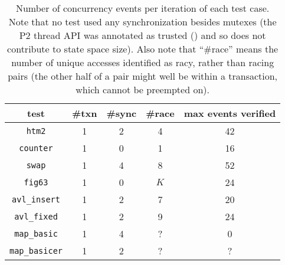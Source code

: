 \begin{table}[h]
	\begin{center}
		\small
		\begin{tabular}{c||c|c|c||c}
			{\bf test} & {\bf \#txn} & {\bf \#sync} & {\bf \#race} & {\bf max events verified} \\
			\hline
			{\tt htm2}		& 1	& 2	& 4	& 42	\\ %
			{\tt counter}		& 1	& 0	& 1	& 16	\\ %
			{\tt swap}		& 1	& 4	& 8	& 52	\\ %
			{\tt fig63}		& 1	& 0	& $K$	& 24	\\ %
			{\tt avl\_insert}	& 1	& 2	& 7	& 20	\\ %
			{\tt avl\_fixed}	& 1	& 2	& 9	& 24	\\ %
			{\tt map\_basic}	& 1	& 4	& ?	& 0	\\ %
			{\tt map\_basicer}	& 1	& 2	& ?	& ?	\\
		\end{tabular}
	\end{center}
	\caption{Number of concurrency events per iteration of each test case.
	Note that no test used any synchronization besides mutexes %
	(the P2 thread API was annotated as trusted (\sect{\ref{sec:landslide-config-landslide}})
	and so does not contribute to state space size).
	Also note that ``\#race'' means the number of unique accesses identified as racy,
	rather than racing pairs
	(the other half of a pair might well be within a transaction, which cannot be preempted on).
	}
	\label{tab:tm-test-case-evence}
\end{table}

